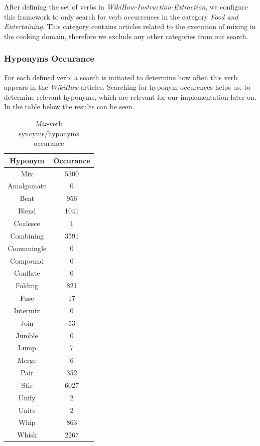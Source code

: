 After defining the set of verbs in \textit{WikiHow-Instruction-Extraction}, we configure this framework to only search for verb occurrences in the category \textit{Food and Entertaining}. 
This category contains articles related to the execution of mixing in the cooking domain, 
therefore we exclude any other categories from our search.

\subsubsection{Hyponyms Occurance}
For each defined verb, a search is initiated to determine how often this verb appears in the \textit{WikiHow} \cite{wikihow} articles. 
Searching for hyponym occurences helps us, to determine relevant hyponyms, which are relevant for our implementation later on.
In the table below the results can be seen.
\begin{table}[H]
  \centering
  \begin{tabular}{|c|c|}
    \hline
    \textbf{Hyponym} & \textbf{Occurance}  \\
    \hline
    Mix & 5300 \\
    \hline
    Amalgamate & 0 \\
    \hline
    Beat & 956 \\
    \hline
    Blend & 1041 \\
    \hline
    Coalesce & 1 \\
    \hline
    Combining & 3591  \\
    \hline
    Coommingle & 0 \\
    \hline
    Compound & 0 \\
    \hline
    Conflate & 0 \\
    \hline
    Folding & 821 \\
    \hline
    Fuse & 17 \\
    \hline
    Intermix & 0 \\
    \hline
    Join & 53 \\
    \hline
    Jumble & 0 \\
    \hline
    Lump & 7 \\
    \hline
    Merge & 6 \\
    \hline
    Pair & 352 \\
    \hline
    Stir & 6027 \\
    \hline
    Unify & 2 \\
    \hline
    Unite & 2 \\
    \hline
    Whip & 863 \\
    \hline
    Whisk & 2267 \\
    \hline
    

  \end{tabular}
  \caption{\textit{Mix}-verb synoyms/hyponyms occurance}
  \label{tab:hyponyms}
\end{table}
    
